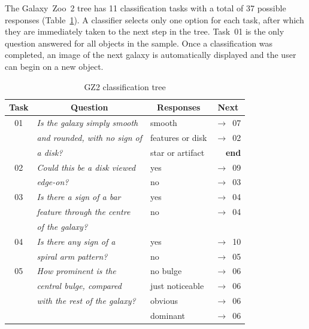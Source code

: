 \documentclass[useAMS,usenatbib]{mn2e}
\begin{document}
The Galaxy~Zoo~2 tree has 11 classification tasks with a total of 37 possible responses (Table~\ref{tbl-tree}). A classifier selects only one option for each task, after which they are immediately taken to the next step in the tree. Task~01 is the only question answered for all objects in the sample. Once a classification was completed, an image of the next galaxy is automatically displayed and the user can begin on a new object. 

\begin{table}
 \caption{GZ2 classification tree \label{tbl-tree}}
 \begin{tabular}{@{}cllr}
 \hline
\multicolumn{1}{l}{Task} &
\multicolumn{1}{c}{Question} &
\multicolumn{1}{c}{Responses} &
\multicolumn{1}{c}{Next} 
\\ 
\hline
\hline						%
01    & {\it Is the galaxy simply smooth   }  & smooth           & $\rightarrow$~07 \\
      & {\it and rounded, with no sign of  }  & features or disk & $\rightarrow$~02 \\
      & {\it a disk?                       }  & star or artifact & {\bf end} \\
      \hline
02    & {\it Could this be a disk viewed   }  & yes              & $\rightarrow$~09 \\
      & {\it edge-on?                      }  & no               & $\rightarrow$~03 \\
      \hline
03    & {\it Is there a sign of a bar      }  & yes              & $\rightarrow$~04 \\
      & {\it feature through the centre    }  & no               & $\rightarrow$~04 \\
      & {\it of the galaxy?                }                                        \\
      \hline
04    & {\it Is there any sign of a        }  & yes              & $\rightarrow$~10 \\
      & {\it spiral arm pattern?           }  & no               & $\rightarrow$~05 \\
      \hline
05    & {\it How prominent is the          }  & no bulge         & $\rightarrow$~06 \\
      & {\it central bulge, compared       }  & just noticeable  & $\rightarrow$~06 \\
      & {\it with the rest of the galaxy?  }  & obvious          & $\rightarrow$~06 \\
      & {\it                               }  & dominant         & $\rightarrow$~06 \\

\end{tabular}
\end{table}
\end{document}
